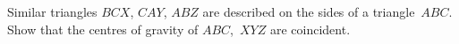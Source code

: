  Similar triangles $BCX$, $CAY$, $ABZ$ are described on the sides of a
triangle~$ABC$. Show that the centres of gravity of $ABC$,~$XYZ$ are coincident.

